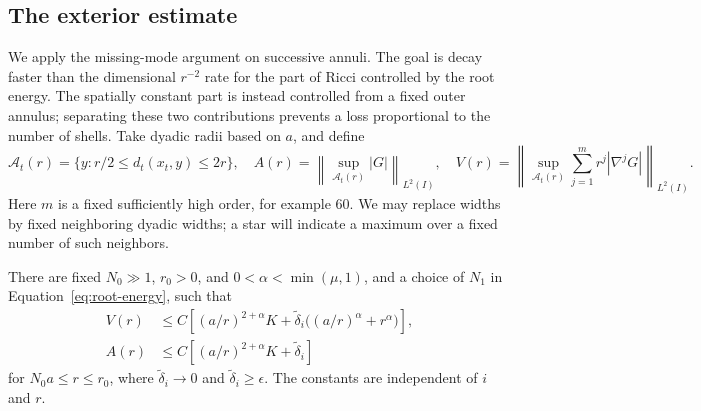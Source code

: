 \subsection{The exterior estimate}
\label{para:exterior-subsection}

We apply the missing-mode argument on successive annuli. The goal is
decay faster than the dimensional $r^{-2}$ rate for the part of Ricci
controlled by the root energy. The spatially constant part is instead
controlled from a fixed outer annulus; separating these two contributions
prevents a loss proportional to the number of shells.
Take dyadic radii based on $a$, and define
\[
 \mathcal A_t(r)=\{y:r/2\le d_t(x_t,y)\le2r\},\quad
 A(r)=\left\|\sup_{\mathcal A_t(r)}|G|\right\|_{L^2(I)},\quad
 V(r)=\left\|\sup_{\mathcal A_t(r)}
                   \sum_{j=1}^m r^j|\nabla^jG|\right\|_{L^2(I)}.
\]
Here $m$ is a fixed sufficiently high order, for example $60$.
We may replace widths by fixed neighboring dyadic widths; a star
will indicate a maximum over a fixed number of such neighbors.

\begin{proposition}
\label{prop:exterior-ricci}
There are fixed $N_0\gg1$, $r_0>0$, and
$0<\alpha<\min(\mu,1)$, and a choice of $N_1$ in
Equation~\eqref{eq:root-energy}, such that
\begin{align}
 V(r)&\le C\left[(a/r)^{2+\alpha}K
             +\widetilde\delta_i\bigl((a/r)^\alpha+r^\alpha\bigr)\right],
 \label{para:exterior-v}\\
 A(r)&\le C\left[(a/r)^{2+\alpha}K+\widetilde\delta_i\right]
 \label{para:exterior-a}
\end{align}
for $N_0a\le r\le r_0$, where
$\widetilde\delta_i\to0$ and $\widetilde\delta_i\ge\epsilon$.
The constants are independent of $i$ and $r$.
\end{proposition}

